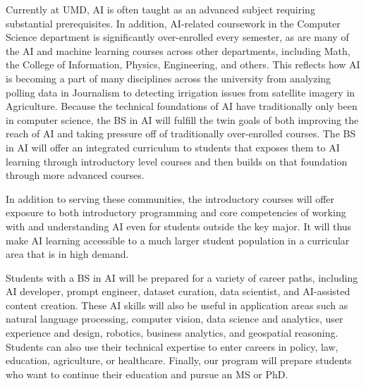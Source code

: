 Currently at UMD, AI is often taught as an advanced subject requiring substantial prerequisites. In addition, AI-related coursework in the Computer Science department is significantly over-enrolled every semester, as are many of the AI and machine learning courses across other departments, including Math, the College of Information, Physics, Engineering, and others. This reflects how AI is becoming a part of many disciplines across the university from analyzing polling data in Journalism to detecting irrigation issues from satellite imagery in Agriculture.  Because the technical foundations of AI have traditionally only been in computer science, the BS in AI will fulfill the twin goals of both improving the reach of AI and taking pressure off of traditionally over-enrolled courses.  The BS in AI will offer an integrated curriculum to students that exposes them to AI learning through introductory level courses and then builds on that foundation through more advanced courses. 

In addition to serving these communities, the introductory courses will offer exposure to both introductory programming and core competencies of working with and understanding AI even for students outside the key major.  It will thus make AI learning accessible to a much larger student population in a curricular area that is in high demand.

Students with a BS in AI will be prepared for a variety of career paths, including AI developer, prompt engineer, dataset curation, data scientist, and AI-assisted content creation.  These AI skills will also be useful in application areas such as natural language processing, computer vision, data science and analytics, user experience and design, robotics, business analytics, and geospatial reasoning. Students can also use their technical expertise to enter careers in policy, law, education, agriculture, or healthcare. Finally, our program will prepare students who want to continue their education and pursue an MS or PhD.
